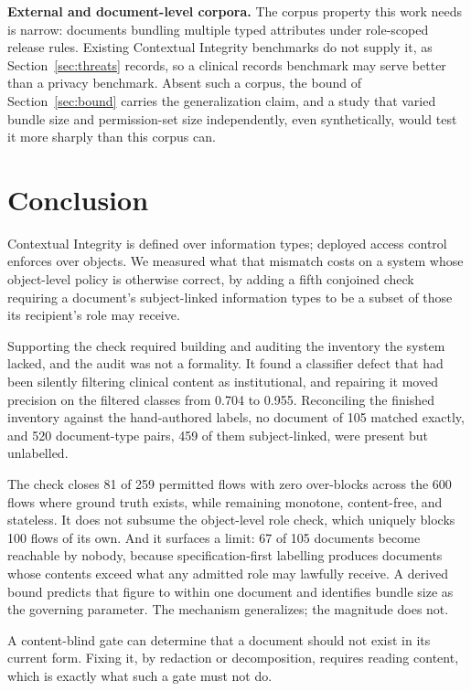 \documentclass[conference]{IEEEtran}
\begin{document}
\textbf{External and document-level corpora.} The corpus property this work
needs is narrow: documents bundling multiple typed attributes under role-scoped
release rules. Existing Contextual Integrity benchmarks do not supply it, as
Section~\ref{sec:threats} records, so a clinical records benchmark may serve
better than a privacy benchmark. Absent such a corpus, the bound of
Section~\ref{sec:bound} carries the generalization claim, and a study that
varied bundle size and permission-set size independently, even synthetically,
would test it more sharply than this corpus can.

\section{Conclusion}

Contextual Integrity is defined over information types; deployed access control
enforces over objects. We measured what that mismatch costs on a system whose
object-level policy is otherwise correct, by adding a fifth conjoined check
requiring a document's subject-linked information types to be a subset of those
its recipient's role may receive.

Supporting the check required building and auditing the inventory the system
lacked, and the audit was not a formality. It found a classifier defect that had
been silently filtering clinical content as institutional, and repairing it moved
precision on the filtered classes from 0.704 to 0.955. Reconciling the finished
inventory against the hand-authored labels, no document of 105 matched exactly,
and 520 document-type pairs, 459 of them subject-linked, were present but
unlabelled.

The check closes 81 of 259 permitted flows with zero over-blocks across the 600
flows where ground truth exists, while remaining monotone, content-free, and
stateless. It does not subsume the object-level role check, which uniquely
blocks 100 flows of its own. And it surfaces a limit: 67 of 105 documents become
reachable by nobody, because specification-first labelling produces documents
whose contents exceed what any admitted role may lawfully receive. A derived
bound predicts that figure to within one document and identifies bundle size as
the governing parameter. The mechanism generalizes; the magnitude does not.

A content-blind gate can determine that a document should not exist in its
current form. Fixing it, by redaction or decomposition, requires reading
content, which is exactly what such a gate must not do.
\end{document}
